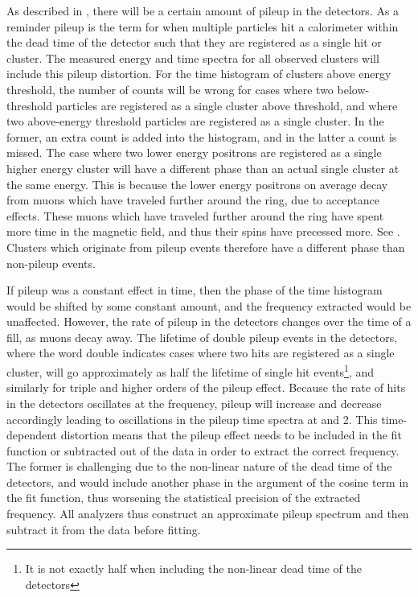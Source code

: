 As described in , there will be a certain amount of pileup in the detectors. As a reminder pileup is the term for when multiple particles hit a calorimeter within the dead time of the detector such that they are registered as a single hit or cluster. The measured energy and time spectra for all observed clusters will include this pileup distortion. For the time histogram of clusters above energy threshold, the number of counts will be wrong for cases where two below-threshold particles are registered as a single cluster above threshold, and where two above-energy threshold particles are registered as a single cluster. In the former, an extra count is added into the histogram, and in the latter a count is missed. The case where two lower energy positrons are registered as a single higher energy cluster will have a different \gmtwo phase than an actual single cluster at the same energy. This is because the lower energy positrons on average decay from muons which have traveled further around the ring, due to acceptance effects. These muons which have traveled further around the ring have spent more time in the magnetic field, and thus their spins have precessed more. See . Clusters which originate from pileup events therefore have a different \gmtwo phase than non-pileup events. 


If pileup was a constant effect in time, then the phase of the time histogram would be shifted by some constant amount, and the \wa frequency extracted would be unaffected. However, the rate of pileup in the detectors changes over the time of a fill, as muons decay away. The lifetime of double pileup events in the detectors, where the word double indicates cases where two hits are registered as a single cluster, will go approximately as half the lifetime of single hit events\footnote{It is not exactly half when including the non-linear dead time of the detectors}, and similarly for triple and higher orders of the pileup effect. Because the rate of hits in the detectors oscillates at the \gmtwo frequency, pileup will increase and decrease accordingly leading to oscillations in the pileup time spectra at \wa and 2\wa. This time-dependent distortion means that the pileup effect needs to be included in the fit function or subtracted out of the data in order to extract the correct \wa frequency. The former is challenging due to the non-linear nature of the dead time of the detectors, and would include another phase in the argument of the cosine term in the fit function, thus worsening the statistical precision of the extracted \wa frequency. All analyzers thus construct an approximate pileup spectrum and then subtract it from the data before fitting.


